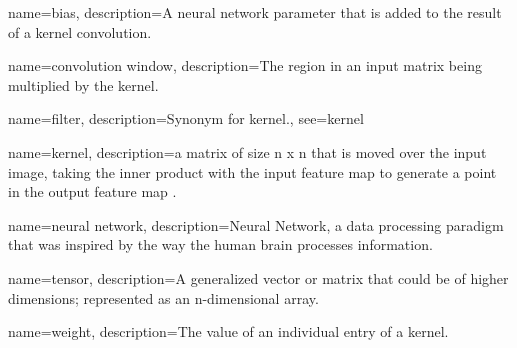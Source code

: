 




{
    name=bias,
    description={A neural network parameter that is added to the result of a kernel convolution.}
}

{
    name=convolution window,
    description={The region in an input matrix being multiplied by the kernel.}
}

{
    name=filter,
    description={Synonym for kernel.},
    see={kernel}
}

{
    name=kernel,
    description={a matrix of size n x n that is moved over the input image, taking the inner product with the input feature map to generate a point in the output feature map .}
}

{
    name=neural network,
    description={Neural Network, a data processing paradigm that was inspired by the way the human brain processes information.}
}

{
    name=tensor,
    description={A generalized vector or matrix that could be of higher dimensions; represented as an n-dimensional array.}
}

{
    name=weight,
    description={The value of an individual entry of a kernel.}
}
